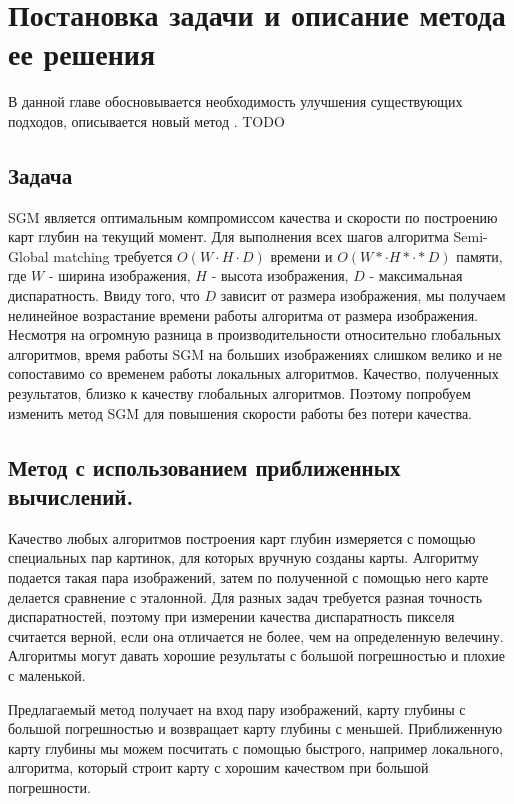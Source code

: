 \chapter{Постановка задачи и описание метода ее решения} 
\label{chapter2}

В данной главе обосновывается необходимость улучшения существующих подходов, описывается новый метод . TODO

\section{Задача}
SGM является оптимальным компромиссом качества и скорости по построению карт глубин на текущий момент. Для выполнения всех шагов алгоритма Semi-Global matching требуется $ O ( W \cdot H \cdot D) $ времени и $ O ( W *\cdot H * \cdot * D) $ памяти, где $W$ - ширина изображения, $H$ - высота изображения, $D$ - максимальная диспаратность. Ввиду того, что $D$ зависит от размера изображения, мы получаем нелинейное возрастание времени работы алгоритма от размера изображения. Несмотря на огромную разница в производительности относительно глобальных алгоритмов, время работы SGM на больших изображениях слишком велико и не сопоставимо со временем работы локальных алгоритмов. Качество, полученных результатов, близко к качеству глобальных алгоритмов. 
Поэтому попробуем изменить метод SGM для повышения скорости работы без потери качества.

\section{Метод с использованием приближенных вычислений.}

Качество любых алгоритмов построения карт глубин измеряется с помощью специальных пар картинок, для которых вручную созданы карты. Алгоритму подается такая пара изображений, затем по полученной с помощью него карте делается сравнение с эталонной. Для разных задач требуется разная точность диспаратностей, поэтому при измерении качества диспаратность пикселя считается верной, если она отличается не более, чем на определенную велечину. Алгоритмы могут давать хорошие результаты с большой погрешностью и плохие с маленькой. 

Предлагаемый метод получает на вход пару изображений, карту глубины с большой погрешностью и возвращает карту глубины с меньшей. Приближенную карту глубины мы можем посчитать с помощью быстрого, например локального, алгоритма, который строит карту с хорошим качеством при большой погрешности. 


